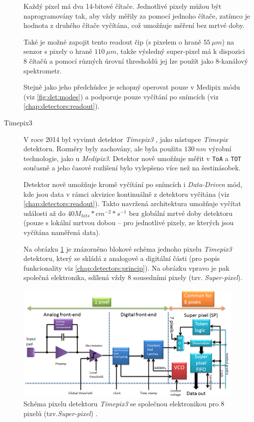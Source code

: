 \begin{description}
	Každý pixel má dva 14-bitové čítače. Jednotlivé pixely můžou být naprogramovány tak, aby vždy měřily za pomocí jednoho čítače, zatímco je hodnota z druhého čítače vyčítána, což umožňuje měření bez mrtvé doby.

	Také je možné zapojit tento readout čip (s pixelem o hraně $55~\mu m$) na senzor s pixely o hraně $110~\mu m$, takže výsledný super-pixel má k dispozici 8 čítačů a pomocí různých úrovní thresholdů jej lze použít jako 8-kanálový spektrometr.

	Stejně jako jeho předchůdce je schopný operovat pouze v Medipix módu (viz \ref{fig:det:modes}) a podporuje pouze vyčítání po snímcích (viz \ref{chap:detectors:readout}).

	\item[Timepix3]\label{chap:detectors:medipix_overview:timepix3} V roce 2014 byl vyvinut detektor \textit{Timepix3} \cite{timepix3}, jako nástupce \textit{Timepix} detektoru. Rozměry byly zachovány, ale byla použita $130~nm$ výrobní technologie, jako u \textit{Medipix3}. Detektor nově umožňuje měřit v \texttt{ToA} a \texttt{TOT} současně a jeho časové rozlišení bylo vylepšeno více než na šestinásobek.

	Detektor nově umožňuje kromě vyčítání po snímcích i \textit{Data-Driven} mód, kde jsou data v rámci akvizice kontinuálně z detektoru vyčítána (viz \ref{chap:detectors:readout}). Takto navržená architektura umožňuje vyčítat události až do $40M_{hits}*cm^{-2}*s^{-1}$ bez globální mrtvé doby detektoru (pouze s lokální mrtvou dobou -- pro jednotlivé pixely, ze kterých jsou vyčítána naměřená data).

	Na obrázku \ref{fig:det:medipix_overview:timepix3_schema} je znázorněno blokové schéma jednoho pixelu \textit{Timepix3} detektoru, který se skládá z analogové a digitální části (pro popis funkcionality viz \ref{chap:detectors:princip}). Na obrázku vpravo je pak společná elektronika, sdílená vždy 8 sousedními pixely (tzv. \textit{Super-pixel}).

\end{description}

\begin{figure}
	\begin{center}
		\includegraphics[width=15cm]{figures/det_timepix3_schema.png}
		\caption{Schéma pixelu detektoru \textit{Timepix3} se společnou elektronikou pro 8 pixelů (tzv.\textit{Super-pixel}) \cite{timepix3}.}
		\label{fig:det:medipix_overview:timepix3_schema}
	\end{center}
\end{figure}

